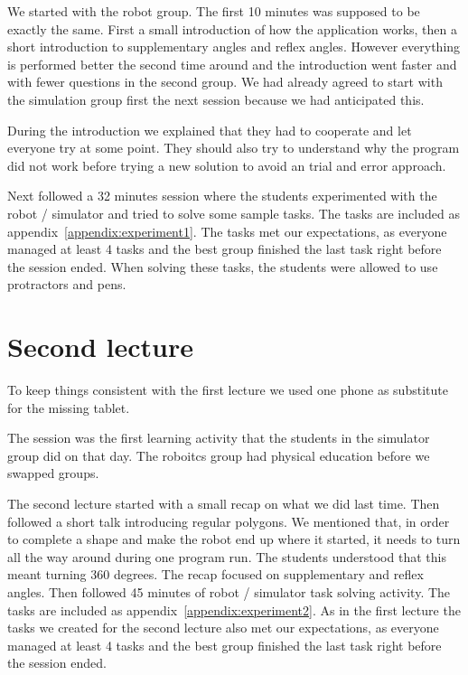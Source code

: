 \bigskip\noindent
We started with the robot group. The first 10 minutes was supposed to be exactly the same. First a small introduction of how the application works, then a short introduction to supplementary angles and reflex angles. However everything is performed better the second time around and the introduction went faster and with fewer questions in the second group. We had already agreed to start with the simulation group first the next session because we had anticipated this.

\bigskip\noindent
During the introduction we explained that they had to cooperate and let everyone try at some point. They should also try to understand why the program did not work before trying a new solution to avoid an trial and error approach.

\bigskip\noindent
Next followed a 32 minutes session where the students experimented with the robot / simulator and tried to solve some sample tasks. The tasks are included as appendix~\ref{appendix:experiment1}.
The tasks met our expectations, as everyone managed at least 4 tasks and the best group finished the last task right before the session ended. When solving these tasks, the students were allowed to use protractors and pens. 

\section{Second lecture}
To keep things consistent with the first lecture we used one phone as substitute for the missing tablet.

\bigskip\noindent
The session was the first learning activity that the students in the simulator group did on that day. 
The roboitcs group had physical education before we swapped groups.

\bigskip\noindent
The second lecture started with a small recap on what we did last time. Then followed a short talk introducing regular polygons. We mentioned that, in order to complete a shape and make the robot end up where it started, it needs to turn all the way around during one program run. The students understood that this meant turning 360 degrees. The recap focused on supplementary and reflex angles. Then followed 45 minutes of robot / simulator task solving activity. The tasks are included as appendix~\ref{appendix:experiment2}.
As in the first lecture the tasks we created for the second lecture also met our expectations, as everyone managed at least 4 tasks and the best group finished the last task right before the session ended. 
